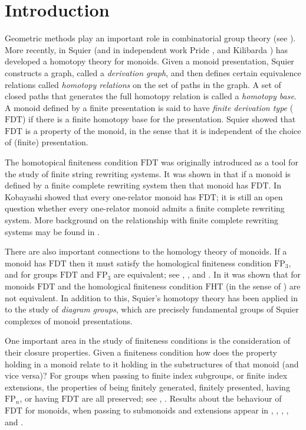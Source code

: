 \documentclass[11pt]{amsart}
\theoremstyle{plain}
\begin{document}
\section{Introduction}

Geometric methods play an important role in combinatorial group theory (see \cite{LyndonandSchupp}). More recently, in \cite{Squier1} Squier (and in independent work Pride \cite{Pride2}, and Kilibarda \cite{Kilibarda1}) has developed a homotopy theory for monoids.  
Given a monoid presentation, Squier constructs a graph, called a \emph{derivation graph}, 
and then defines certain equivalence relations called \emph{homotopy relations} on the set of paths in the graph. A set of closed paths that generates the full homotopy relation is called a \emph{homotopy base}. A monoid defined by a finite presentation is said to have \emph{finite derivation type} ($\mathrm{FDT}$) if there is a finite homotopy base for the presentation. Squier showed that 
$\mathrm{FDT}$ is a property of the monoid, in the sense that it is independent of the choice of (finite) presentation. 

The homotopical finiteness condition $\mathrm{FDT}$ was originally introduced as a tool for the study of finite string rewriting systems. 
It was shown in \cite{Squier1} that if a monoid is defined by a finite complete rewriting system then that monoid has $\mathrm{FDT}$. In \cite{K2} Kobayashi showed that every one-relator monoid has $\mathrm{FDT}$; it is still an open question whether every one-relator monoid admits a finite complete rewriting system. 
More background on the relationship with finite complete rewriting systems may be found in \cite{OttoSurvey}. 

There are also important connections to the homology theory of monoids. If a monoid has $\mathrm{FDT}$ then it must satisfy the homological finiteness condition $\mathrm{FP}_3$, and for groups $\mathrm{FDT}$ and $\mathrm{FP}_3$ are equivalent; see \cite{Cremanns5}, \cite{Pride2}, \cite{Lafont} and \cite{Cremanns1}. In \cite{Pride4} it was shown that for monoids $\mathrm{FDT}$ and the homological finiteness condition $\mathrm{FHT}$ (in the sense of \cite{Wang8}) are not equivalent. In addition to this, Squier's homotopy theory has been applied in \cite{Guba} to the study of \emph{diagram groups}, which are precisely fundamental groups of Squier complexes of monoid presentations. 

One important area in the study of finiteness conditions is the consideration of their closure properties. Given a finiteness condition how does the property holding in a monoid relate to it holding in the substructures of that monoid (and vice versa)? For groups when passing to finite index subgroups, or finite index extensions, the properties of being finitely generated, finitely presented, having $\mathrm{FP}_n$, or having $\mathrm{FDT}$ are all preserved; see \cite{Magnus1}, \cite{Brown}. Results about the behaviour of $\mathrm{FDT}$ for monoids, when passing to submonoids and extensions appear in \cite{Wang1}, \cite{Malheiro1}, \cite{Pride4}, \cite{Malheiro3}, \cite{Wang7} and \cite{Malheiro2}.    
\end{document}
